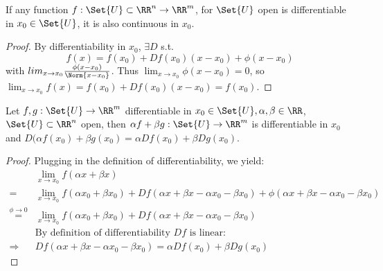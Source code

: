 \begin{prop}
  If any function $f:\Set{U}\subset\RR^n\to\RR^m$, for $\Set{U}$ open is differentiable in $x_0\in\Set{U}$, it is also continuous in $x_0$. 
\end{prop}
\begin{proof}
  By differentiability in $x_0$, $\exists D$ s.t. $$f(x)=f(x_0)+Df(x_0)(x-x_0)+\phi(x-x_0)$$ with $lim_{x\to x_0}\frac{\phi(x-x_0)}{\Norm{x-x_0}}$. Thus $\lim_{x\to x_0}\phi(x-x_0)=0$, so $\lim_{x\to x_0}f(x)=f(x_0)+Df(x_0)(x-x_0)=f(x_0)$.
\end{proof}


\begin{prop}[linearity]
  Let $f, g:\Set{U}\to \RR^m$ differentiable in $x_0\in \Set{U}, \alpha, \beta\in\RR$, $\Set{U}\subset\RR^n$ open, then $\alpha f+\beta g:\Set{U}\to\RR^m$ is differentiable in $x_0$ and $D(\alpha f(x_0)+\beta g(x_0)=\alpha Df(x_0)+\beta D g(x_0)$.
\end{prop}
\begin{proof}
  Plugging in the definition of differentiability, we yield:
  \begin{align*}
  	&\lim_{x\to x_0}f(\alpha x+\beta x)\\
  	=&\lim_{x\to x_0}f(\alpha x_0+\beta x_0)+Df(\alpha x+\beta x-\alpha x_0-\beta x_0)+\phi(\alpha x+\beta x-\alpha x_0-\beta x_0)\\\overset{\phi\to 0}{=}&\lim_{x\to x_0}f(\alpha x_0+\beta x_0)+Df(\alpha x+\beta x-\alpha x_0-\beta x_0)\\&\text{By definition of differentiability $Df$ is linear:}\\
  	\Rightarrow& Df(\alpha x+\beta x-\alpha x_0-\beta x_0)=\alpha Df(x_0)+\beta D g(x_0)
  \end{align*}
\end{proof}


